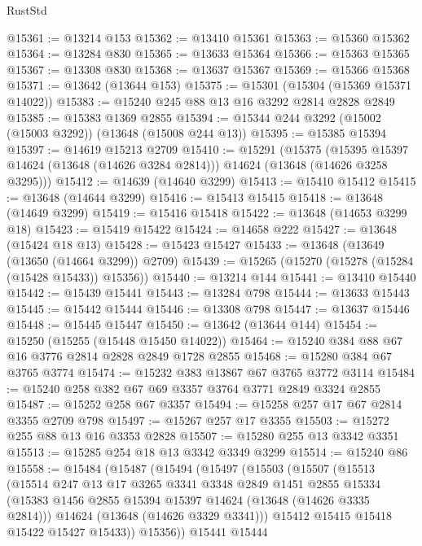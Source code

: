 \begin{lexlean}{RustStd}
\begin{coremodule}
@15361 := @13214 @153
@15362 := @13410 @15361
@15363 := @15360 @15362
@15364 := @13284 @830
@15365 := @13633 @15364
@15366 := @15363 @15365
@15367 := @13308 @830
@15368 := @13637 @15367
@15369 := @15366 @15368
@15371 := @13642 (@13644 @153)
@15375 := @15301 (@15304 (@15369 @15371 @14022))
@15383 := @15240 @245 @88 @13 @16 @3292 @2814 @2828 @2849
@15385 := @15383 @1369 @2855
@15394 := @15344 @244 @3292 (@15002 (@15003 @3292)) (@13648 (@15008 @244 @13))
@15395 := @15385 @15394
@15397 := @14619 @15213 @2709
@15410 := @15291
    (@15375
      (@15395 @15397 @14624 (@13648 (@14626 @3284 @2814)))
      @14624
      (@13648 (@14626 @3258 @3295)))
@15412 := @14639 (@14640 @3299)
@15413 := @15410 @15412
@15415 := @13648 (@14644 @3299)
@15416 := @15413 @15415
@15418 := @13648 (@14649 @3299)
@15419 := @15416 @15418
@15422 := @13648 (@14653 @3299 @18)
@15423 := @15419 @15422
@15424 := @14658 @222
@15427 := @13648 (@15424 @18 @13)
@15428 := @15423 @15427
@15433 := @13648 (@13649 (@13650 (@14664 @3299)) @2709)
@15439 := @15265 (@15270 (@15278 (@15284 (@15428 @15433)) @15356))
@15440 := @13214 @144
@15441 := @13410 @15440
@15442 := @15439 @15441
@15443 := @13284 @798
@15444 := @13633 @15443
@15445 := @15442 @15444
@15446 := @13308 @798
@15447 := @13637 @15446
@15448 := @15445 @15447
@15450 := @13642 (@13644 @144)
@15454 := @15250 (@15255 (@15448 @15450 @14022))
@15464 := @15240 @384 @88 @67 @16 @3776 @2814 @2828 @2849 @1728 @2855
@15468 := @15280 @384 @67 @3765 @3774
@15474 := @15232 @383 @13867 @67 @3765 @3772 @3114
@15484 := @15240 @258 @382 @67 @69 @3357 @3764 @3771 @2849 @3324 @2855
@15487 := @15252 @258 @67 @3357
@15494 := @15258 @257 @17 @67 @2814 @3355 @2709 @798
@15497 := @15267 @257 @17 @3355
@15503 := @15272 @255 @88 @13 @16 @3353 @2828
@15507 := @15280 @255 @13 @3342 @3351
@15513 := @15285 @254 @18 @13 @3342 @3349 @3299
@15514 := @15240 @86
@15558 := @15484
    (@15487
      (@15494
        (@15497
          (@15503
            (@15507
              (@15513
                (@15514
                  @247
                  @13
                  @17
                  @3265
                  @3341
                  @3348
                  @2849
                  @1451
                  @2855
                  @15334
                  (@15383 @1456 @2855 @15394 @15397 @14624 (@13648 (@14626 @3335 @2814)))
                  @14624
                  (@13648 (@14626 @3329 @3341)))
                @15412
                @15415
                @15418
                @15422
                @15427
                @15433))
            @15356))
        @15441
        @15444

\end{coremodule}
\end{lexlean}
